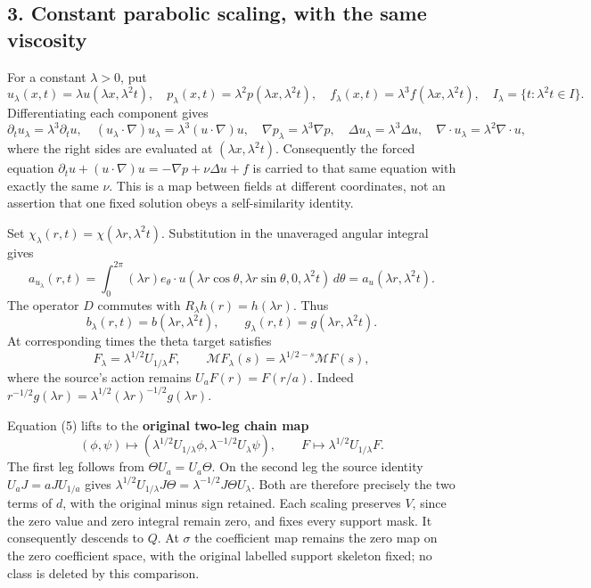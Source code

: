 \documentclass[10pt,a4paper,oneside]{report}
\begin{document}
\subsection{3. Constant parabolic scaling, with the same
viscosity}\label{proof09:constant-parabolic-scaling-with-the-same-viscosity}

For a constant \(\lambda>0\), put \[
u_\lambda(x,t)=\lambda u(\lambda x,\lambda^2t),\quad
p_\lambda(x,t)=\lambda^2p(\lambda x,\lambda^2t),\quad
f_\lambda(x,t)=\lambda^3f(\lambda x,\lambda^2t),
\quad I_\lambda=\{t:\lambda^2t\in I\}.
\] Differentiating each component gives \[
\partial_tu_\lambda=\lambda^3\partial_tu,\quad
(u_\lambda\cdot\nabla)u_\lambda=\lambda^3(u\cdot\nabla)u,\quad
\nabla p_\lambda=\lambda^3\nabla p,\quad
\Delta u_\lambda=\lambda^3\Delta u,
\quad \nabla\cdot u_\lambda=\lambda^2\nabla\cdot u,
\] where the right sides are evaluated at \((\lambda x,\lambda^2t)\).
Consequently the forced equation
\(\partial_tu+(u\cdot\nabla)u=-\nabla p+\nu\Delta u+f\) is carried to
that same equation with exactly the same \(\nu\). This is a map between
fields at different coordinates, not an assertion that one fixed
solution obeys a self-similarity identity.

Set \(\chi_\lambda(r,t)=\chi(\lambda r,\lambda^2t)\). Substitution in
the unaveraged angular integral gives \[
a_{u_\lambda}(r,t)=\int_0^{2\pi}(\lambda r)e_\theta\cdot u(\lambda r\cos\theta,\lambda r\sin\theta,0,\lambda^2t)\,d\theta
=a_u(\lambda r,\lambda^2t).
\] The operator \(D\) commutes with \(R_\lambda h(r)=h(\lambda r)\).
Thus \[
b_\lambda(r,t)=b(\lambda r,\lambda^2t),\qquad
g_\lambda(r,t)=g(\lambda r,\lambda^2t).
\tag{4}
\] At corresponding times the theta target satisfies \[
\boxed{F_\lambda=\lambda^{1/2}U_{1/\lambda}F,\qquad
\mathcal MF_\lambda(s)=\lambda^{1/2-s}\mathcal MF(s),}
\tag{5}
\] where the source's action remains \(U_aF(r)=F(r/a)\). Indeed
\(r^{-1/2}g(\lambda r)=\lambda^{1/2}(\lambda r)^{-1/2}g(\lambda r)\).

Equation (5) lifts to the \textbf{original two-leg chain map} \[
(\phi,\psi)\longmapsto
(\lambda^{1/2}U_{1/\lambda}\phi,\lambda^{-1/2}U_\lambda\psi),\qquad
F\longmapsto\lambda^{1/2}U_{1/\lambda}F.
\tag{6}
\] The first leg follows from \(\Theta U_a=U_a\Theta\). On the second
leg the source identity \(U_aJ=aJU_{1/a}\) gives
\(\lambda^{1/2}U_{1/\lambda}J\Theta=\lambda^{-1/2}J\Theta U_\lambda\).
Both are therefore precisely the two terms of \(d\), with the original
minus sign retained. Each scaling preserves \(V\), since the zero value
and zero integral remain zero, and fixes every support mask. It
consequently descends to \(Q\). At \(\sigma\) the coefficient map
remains the zero map on the zero coefficient space, with the original
labelled support skeleton fixed; no class is deleted by this comparison.
\end{document}
